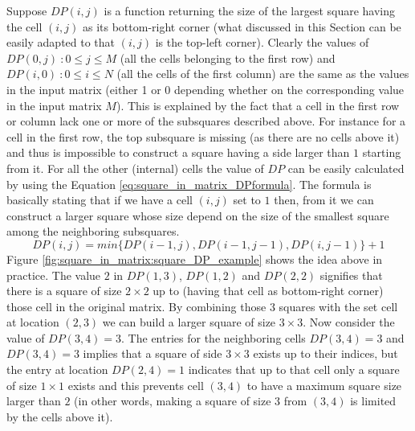 Suppose $DP(i,j)$ is a function returning the size of the largest square having the cell $(i,j)$ as
its bottom-right corner (what discussed in this Section can be easily adapted to
that $(i,j)$ is the top-left corner). Clearly the values of $DP(0,j) \: : 0 \leq j \leq M$ (all the cells
belonging to the first row) and $DP(i,0) \: : 0 \leq i \leq N$ (all the cells of the first column)
are the same as the values in the input matrix (either 1 or 0 depending whether on the corresponding
value in the input matrix $M$). This is explained by the fact that a cell in the first row or column
lack one or more of the subsquares described above. For instance for a cell in the first row, the
top subsquare is missing (as there are no cells above it) and thus is impossible to construct a
square having a side larger than $1$ starting from it. For all the other (internal) cells the value
of $DP$ can be easily calculated by using the Equation \ref{eq:square_in_matrix_DPformula}. The
formula is basically stating that if we have a cell $(i,j)$ set to $1$ then, from it we can
construct a larger square whose size depend on the size of the smallest square among the
neighboring subsquares.
\begin{equation}
	\label{eq:square_in_matrix_DPformula}
	DP(i,j) = min\{DP(i-1,j),DP(i-1,j-1), DP(i,j-1)\} +1
\end{equation}
Figure \ref{fig:square_in_matrix:square_DP_example} shows the idea above in practice. The value $2$
in $DP(1,3)$, $DP(1,2)$ and $DP(2,2)$ signifies that there is a square of size
$2\times 2$ up to (having that cell as bottom-right corner)
those cell in the original matrix. By combining those $3$ squares with the set cell at location
$(2,3)$ we can build a larger square of size $3\times 3$. Now consider the value of $DP(3,4)=3$. The
entries for the neighboring cells $DP(3,4)=3$ and $DP(3,4)=3$ implies that a square of side $3\times
3$ exists up to their indices, but the entry at location $DP(2,4)=1$ indicates that up to that cell
only a square of size $1\times 1$ exists and this prevents cell $(3,4)$ to have a maximum square
size larger than $2$ (in other words, making a square of size $3$ from $(3,4)$ is limited by the cells above it).

